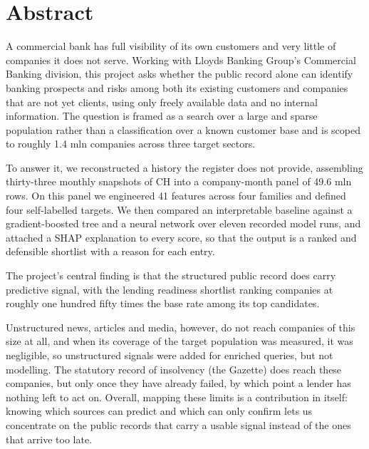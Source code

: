 \documentclass[    author={Samuel Menon Demelo; Sneha Saphala Ram Prasad; 
Viktor Ander Lindholm; Vishal Khatri},
               supervisor={Prof. Fernando Moreno-Pino},
                   degree={MSc},
                    title={Lloyds Commercial Banking Intelligence},
                 subtitle={Ranking SME Lending, Risk and Growth Prospects for Lloyds Banking Group},
                     type={},
                     year={2026}]{dissertation}
\begin{document}
\maketitle
\frontmatter
\makedecl
\makediaisclosure

\tableofcontents
\listoffigures
\listoftables

\chapter*{Abstract}
A commercial bank has full visibility of its own customers and very little of companies it does not serve. Working with Lloyds Banking Group's Commercial Banking division, this project asks whether the public record alone can identify banking prospects and risks among both its existing customers and companies that are not yet clients, using only freely available data and no internal information. The question is framed as a search over a large and sparse population rather than a classification over a known customer base and is scoped to roughly 1.4 mln companies across three target sectors.

To answer it, we reconstructed a history the register does not provide, assembling thirty-three monthly snapshots of CH into a company-month panel of 49.6 mln rows. On this panel we engineered 41 features across four families and defined four self-labelled targets. We then compared an interpretable baseline against a gradient-boosted tree and a neural network over eleven recorded model runs, and attached a SHAP explanation to every score, so that the output is a ranked and defensible shortlist with a reason for each entry.

The project's central finding is that the structured public record does carry predictive signal, with the lending readiness shortlist ranking companies at roughly one hundred fifty times the base rate among its top candidates. 

Unstructured news, articles and media, however, do not reach companies of this size at all, and when its coverage of the target population was measured, it was negligible, so unstructured signals were added for enriched queries, but not modelling. The statutory record of insolvency (the Gazette) does reach these companies, but only once they have already failed, by which point a lender has nothing left to act on. Overall, mapping these limits is a contribution in itself: knowing which sources can predict and which can only confirm lets us concentrate on the public records that carry a usable signal instead of the ones that arrive too late.
\end{document}

